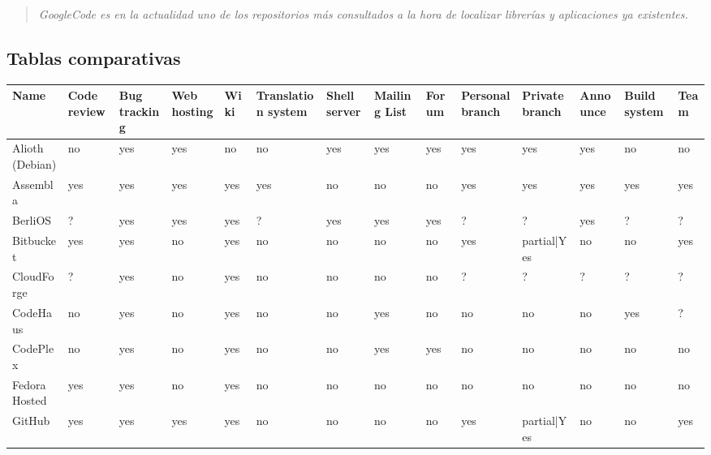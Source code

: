 \begin{quote}
    \emph{GoogleCode es en la actualidad uno de los repositorios más consultados a la hora de localizar librerías y aplicaciones ya existentes.}
\end{quote}


\subsection{Tablas comparativas}
\label{sub:comparativa}

\begin{table}[H]
\centering
\resizebox{\textwidth}{!} {
\begin{tabular}{|l|l|l|l|l|l|l|l|l|l|l|l|l|l|}
    \hline {\bf Name} & {\bf Code review} & {\bf Bug tracking} & {\bf Web hosting} & {\bf Wiki} & {\bf Translation system} & {\bf Shell server} & {\bf Mailing List} & {\bf Forum} & {\bf Personal branch} & {\bf Private branch} & {\bf Announce} & {\bf Build system} & {\bf Team}\\

    \hline Alioth (Debian) & no & yes & yes & no & no & yes & yes & yes & yes & yes & yes & no & no \\

    \hline Assembla & yes & yes & yes & yes & yes & no & no & no & yes & yes & yes & yes & yes\\

    \hline BerliOS & ? & yes & yes & yes & ? & yes & yes & yes & ? & ? & yes & ? & ?\\

    \hline Bitbucket & yes & yes & no & yes & no & no & no & no & yes & partial|Yes & no & no & yes\\

    \hline CloudForge & ? & yes & no & yes & no & no & no & no & ?    & ? & ? & ? & ?\\

    \hline CodeHaus & no & yes & no & yes & no & no & yes & no & no & no & no & yes & ?\\

    \hline CodePlex & no & yes & no & yes & no & no & yes & yes & no & no & no & no & no\\

    \hline Fedora Hosted & yes & yes & no & yes & no & no & no & no & no & no & no & no & no\\

    \hline GitHub & yes & yes & yes & yes & no & no & no & no & yes & partial|Yes & no & no & yes\\


\end{tabular}}
\end{table}

